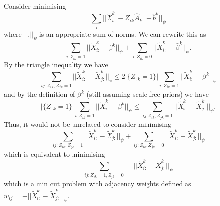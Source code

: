 \documentclass{article}
\numberwithin{equation}{section}
\numberwithin{thm}{section}
\def\IBP{Z}
\def\Weights{A}
\def\Residuals{\tilde{X}}
\def\bias{b}
\def\centre{\beta}
\begin{document}

Consider minimising
\begin{equation}
\sum_i||\Residuals^k_{i:} - \IBP_{ik}\hat{\Weights}_{k:} - \hat{\bias}^k||_\psi
\end{equation}
where $||.||_\psi$ is an appropriate sum of norms. We can rewrite this as
\begin{equation}
\sum_{i: \IBP_{ik} = 1}||\Residuals^k_{i:} - \centre^k||_\psi + \sum_{i: \IBP_{ik} = 0}||\Residuals^k_{i:} - \bar{\centre}^k||_\psi.
\end{equation}
By the triangle inequality we have
\begin{equation}
\sum_{ij: \IBP_{ik},\IBP_{jk} = 1}||\Residuals^k_{i:} - \Residuals^k_{j:}||_\psi \leq 2|\{\IBP_{:k} = 1\}|\sum_{i: \IBP_{ik} = 1}||\Residuals^k_{i:} - \centre^k||_\psi
\end{equation}
and by the definition of $\centre^k$ (still assuming scale free priors) we have
\begin{equation}
|\{\IBP_{:k} = 1\}|\sum_{i: \IBP_{ik} = 1}||\Residuals^k_{i:} - \centre^k||_\psi \leq \sum_{ij: \IBP_{ik},\IBP_{jk} = 1}||\Residuals^k_{i:} - \Residuals^k_{j:}||_\psi.
\end{equation}
Thus, it would not be unrelated to consider minimising
\begin{equation}
\sum_{ij: \IBP_{ik},\IBP_{jk} = 1}||\Residuals^k_{i:} - \Residuals^k_{j:}||_\psi + \sum_{ij: \IBP_{ik},\IBP_{jk} = 0}||\Residuals^k_{i:} - \Residuals^k_{j:}||_\psi
\end{equation}
which is equivalent to minimising
\begin{equation}
\sum_{ij: \IBP_{ik} = 1, \IBP_{jk} = 0}-||\Residuals^k_{i:} - \Residuals^k_{j:}||_\psi 
\end{equation}
which is a min cut problem with adjacency weights defined as $w_{ij} = -||\Residuals^k_{i:} - \Residuals^k_{j:}||_\psi$.
\end{document}
